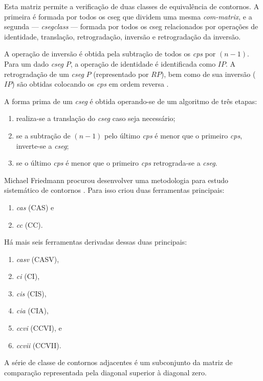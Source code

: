 \documentclass[12pt,brazil]{book}
\newcommand{\eg}[1]{\textit{\gls{#1}}}
\begin{document}
Esta matriz permite a verificação de duas classes de equivalência de
contornos. A primeira é formada por todos os \gls{cseg} que dividem
uma mesma \eg{com-matrix}, e a segunda ---
\eg{csegclass} --- formada por todos os \gls{cseg} relacionados
por operações de identidade, translação, retrogradação, inversão e
retrogradação da inversão.

A operação de inversão é obtida pela subtração de todos os
\eg{cps} por $(n-1)$. Para um dado \eg{cseg} $P$, a
operação de identidade é identificada como $IP$. A retrogradação de um
\eg{cseg} $P$ (representado por $RP$), bem como de sua inversão
($IP$) são obtidas colocando os \eg{cps} em ordem reversa
\cite[p. 231]{marvin.ea87:relating}.

A forma prima de um \eg{cseg} é obtida operando-se de um
algoritmo de três etapas:
\begin{enumerate}
\item realiza-se a translação do \eg{cseg} caso seja necessário;
\item se a subtração de $(n-1)$ pelo último \eg{cps} é menor
  que o primeiro \eg{cps}, inverte-se a \eg{cseg};
\item se o último \eg{cps} é menor que o primeiro
  \eg{cps} retrograda-se a \eg{cseg}.
\end{enumerate}

Michael Friedmann procurou desenvolver uma metodologia para estudo
sistemático de contornos \cite{friedmann85:methodology}. Para isso
criou duas ferramentas principais:

\begin{enumerate}
\item \eg{cas} (CAS) e
\item \eg{cc} (CC).
\end{enumerate}

Há mais seis ferramentas derivadas dessas duas principais:

\begin{enumerate}
\item \eg{casv} (CASV),
\item \eg{ci} (CI),
\item \eg{cis} (CIS),
\item \eg{cia} (CIA),
\item \eg{ccvi} (CCVI), e
\item \eg{ccvii} (CCVII).
\end{enumerate}

A série de classe de contornos adjacentes é um subconjunto da matriz
de comparação representada pela diagonal superior à diagonal zero.
\end{document}
